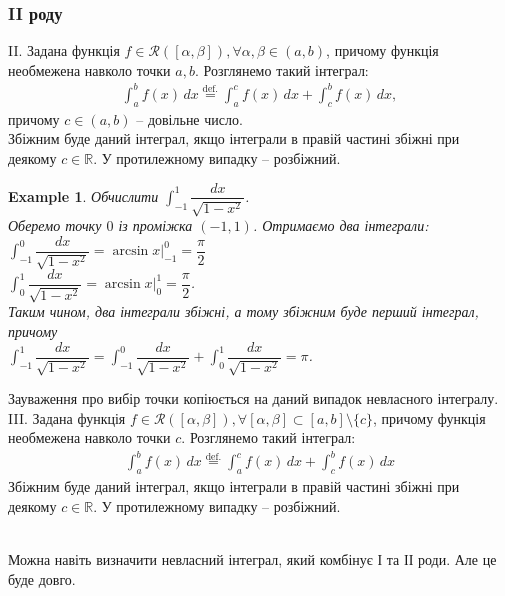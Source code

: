 \documentclass[a4paper, 10pt]{article}
\theoremstyle{theoremdd}
\theoremstyle{theoremdd}
\theoremstyle{theoremdd}
\theoremstyle{theoremdd}
\theoremstyle{theoremdd}
\newtheorem{example}[theorem]{Example}
\theoremstyle{theoremdd}
\theoremstyle{theoremdd}
\theoremstyle{theoremdd}
\theoremstyle{theoremdd}
\begin{document}
\subsubsection{II роду}
II. Задана функція $f \in \mathcal{R}([\alpha,\beta]), \forall \alpha,\beta \in (a,b)$, причому функція необмежена навколо точки $a,b$. Розглянемо такий інтеграл:
\begin{align*}
\int_a^b f(x)\,dx \overset{\text{def.}}{=} \int_a^c f(x)\,dx + \int_c^b f(x)\,dx,
\end{align*}
причому $c \in (a,b)$ -- довільне число.\\
Збіжним буде даний інтеграл, якщо інтеграли в правій частині збіжні при деякому $c \in \mathbb{R}$. У протилежному випадку -- розбіжний.

\begin{example}
Обчислити $\displaystyle\int_{-1}^1 \dfrac{dx}{\sqrt{1-x^2}}$.\\
Оберемо точку $0$ із проміжка $(-1,1)$. Отримаємо два інтеграли:\\
$\displaystyle\int_{-1}^0 \dfrac{dx}{\sqrt{1-x^2}} = \arcsin x \Big|_{-1}^0 = \dfrac{\pi}{2}$\\
$\displaystyle\int_0^1 \dfrac{dx}{\sqrt{1-x^2}} = \arcsin x \Big|_0^1 = \dfrac{\pi}{2}$.\\
Таким чином, два інтеграли збіжні, а тому збіжним буде перший інтеграл, причому\\
$\displaystyle\int_{-1}^1 \dfrac{dx}{\sqrt{1-x^2}} = \int_{-1}^0 \dfrac{dx}{\sqrt{1-x^2}} + \int_{0}^1 \dfrac{dx}{\sqrt{1-x^2}} = \pi$.
\end{example}
\noindent
Зауваження про вибір точки копіюється на даний випадок невласного інтегралу.
\bigskip \\
III. Задана функція $f \in \mathcal{R}([\alpha,\beta]), \forall [\alpha,\beta] \subset [a,b] \setminus \{c\}$, причому функція необмежена навколо точки $c$. Розглянемо такий інтеграл:
\begin{align*}
\int_a^b f(x)\,dx \overset{\text{def.}}{=} \int_a^c f(x)\,dx + \int_c^b f(x)\,dx
\end{align*}
Збіжним буде даний інтеграл, якщо інтеграли в правій частині збіжні при деякому $c \in \mathbb{R}$. У протилежному випадку -- розбіжний.

\bigskip \\
Можна навіть визначити невласний інтеграл, який комбінує І та ІІ роди. Але це буде довго.
\end{document}
